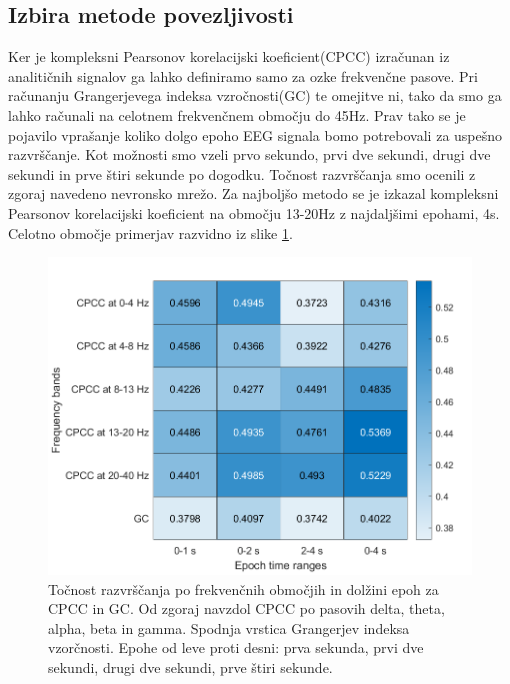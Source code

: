 \subsection{Izbira metode povezljivosti}
Ker je kompleksni Pearsonov korelacijski koeficient(CPCC) izračunan iz analitičnih signalov ga lahko definiramo samo za ozke frekvenčne pasove. Pri računanju Grangerjevega indeksa vzročnosti(GC) te omejitve ni, tako da smo ga lahko računali na celotnem frekvenčnem območju do 45Hz. Prav tako se je pojavilo vprašanje koliko dolgo epoho EEG signala bomo potrebovali za uspešno razvrščanje. Kot možnosti smo vzeli prvo sekundo, prvi dve sekundi, drugi dve sekundi in prve štiri sekunde po dogodku. Točnost razvrščanja smo ocenili z zgoraj navedeno nevronsko mrežo. Za najboljšo metodo se je izkazal kompleksni Pearsonov korelacijski koeficient na območju 13-20Hz z najdaljšimi epohami, 4s. Celotno območje primerjav razvidno iz slike \ref{slika:primerjava_obmocij}.
\begin{figure}
    \begin{center}
    \includegraphics[width=1\linewidth]{slike/Comparison.png}
    \end{center}
    \caption[Točnost razvrščanja po frekvenčnih območjih in dolžini epoh.]{Točnost razvrščanja po frekvenčnih območjih in dolžini epoh za CPCC in GC. Od zgoraj navzdol CPCC po pasovih delta, theta, alpha, beta in gamma. Spodnja vrstica Grangerjev indeksa vzorčnosti. Epohe od leve proti desni: prva sekunda, prvi dve sekundi, drugi dve sekundi, prve štiri sekunde.}
    \label{slika:primerjava_obmocij}
\end{figure}

